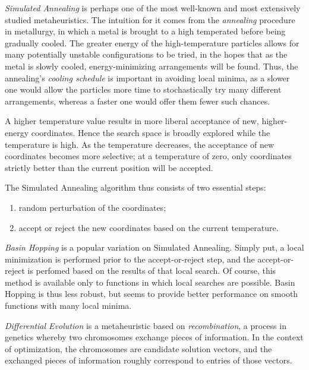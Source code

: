 \documentclass[12pt]{article}
\begin{document}
    \emph{Simulated Annealing}\cite{kirkpatrick1983} is perhaps one of the most
    well-known and most extensively studied metaheuristics.
    The intuition for it comes from the \emph{annealing} procedure in
    metallurgy, in which a metal is brought to a high temperated before being
    gradually cooled.
    The greater energy of the high-temperature particles allows for many
    potentially unstable configurations to be tried, in the hopes that as the
    metal is slowly cooled, energy-minimizing arrangements will be found.
    Thus, the annealing's \emph{cooling schedule} is important in avoiding
    local minima, as a slower one would allow the particles more time to
    stochastically try many different arrangements, whereas a faster one would
    offer them fewer such chances.

    A higher temperature value results in more liberal acceptance of new,
    higher-energy coordinates.
    Hence the search space is broadly explored while the temperature is high.
    As the temperature decreases, the acceptance of new coordinates becomes
    more selective; at a temperature of zero, only coordinates strictly better
    than the current position will be accepted.

    The Simulated Annealing algorithm thus consists of two essential steps:
    \begin{enumerate}
        \item random perturbation of the coordinates;
        \item accept or reject the new coordinates based on the current
            temperature.
    \end{enumerate}

    \emph{Basin Hopping}\cite{wales1997} is a popular variation on Simulated
    Annealing.
    Simply put, a local minimization is performed prior to the accept-or-reject
    step, and the accept-or-reject is perfomed based on the results of that
    local search.
    Of course, this method is available only to functions in which local
    searches are possible.
    Basin Hopping is thus less robust, but seems to provide better performance
    on smooth functions with many local minima.

    \emph{Differential Evolution}\cite{storn1997} is a metaheuristic based on
    \emph{recombination}, a process in genetics whereby two chromosomes
    exchange pieces of information.
    In the context of optimization, the chromosomes are candidate solution
    vectors, and the exchanged pieces of information roughly correspond to
    entries of those vectors.
\end{document}
